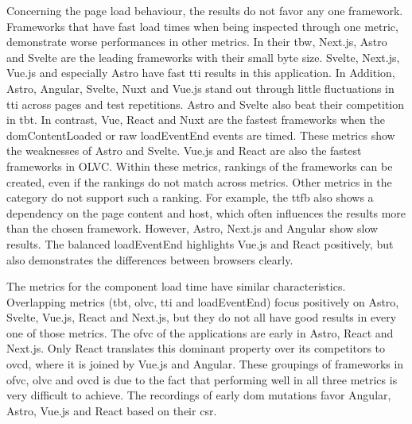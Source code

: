 \documentclass[a4paper, 12pt]{article}
\begin{document}
Concerning the page load behaviour, the results do not favor any one framework.
Frameworks that have fast load times when being inspected through one metric, demonstrate worse performances in other metrics.
In their \acrlong{tbw}, Next.js, Astro and Svelte are the leading frameworks with their small byte size.
Svelte, Next.js, Vue.js and especially Astro have fast \acrlong{tti} results in this application.
In Addition, Astro, Angular, Svelte, Nuxt and Vue.js stand out through little fluctuations in \acrshort{tti} across pages and test repetitions.
Astro and Svelte also beat their competition in \acrlong{tbt}.
In contrast, Vue, React and Nuxt are the fastest frameworks when the domContentLoaded or raw loadEventEnd events are timed.
These metrics show the weaknesses of Astro and Svelte.
Vue.js and React are also the fastest frameworks in OLVC.
Within these metrics, rankings of the frameworks can be created, even if the rankings do not match across metrics.
Other metrics in the category do not support such a ranking.
For example, the \acrlong{ttfb} also shows a dependency on the page content and host, which often influences the results more than the chosen framework.
However, Astro, Next.js and Angular show slow results.
The balanced loadEventEnd highlights Vue.js and React positively, but also demonstrates the differences between browsers clearly.

The metrics for the component load time have similar characteristics.
Overlapping metrics (\acrshort{tbt}, \acrshort{olvc}, \acrshort{tti} and loadEventEnd) focus positively on Astro, Svelte, Vue.js, React and Next.js, but they do not all have good results in every one of those metrics.
The \acrshort{ofvc} of the applications are early in Astro, React and Next.js.
Only React translates this dominant property over its competitors to \acrshort{ovcd}, where it is joined by Vue.js and Angular.
These groupings of frameworks in \acrshort{ofvc}, \acrshort{olvc} and \acrshort{ovcd} is due to the fact that performing well in all three metrics is very difficult to achieve.
The recordings of early \acrshort{dom} mutations favor Angular, Astro, Vue.js and React based on their \acrshort{csr}.
\end{document}
